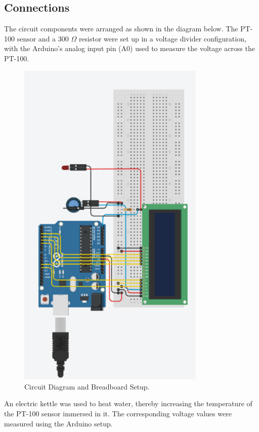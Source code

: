 \documentclass{article}
\begin{document}
	\subsection{Connections}
	The circuit components were arranged as shown in the diagram below. The PT-100 sensor and a 300 $\Omega$ resistor were set up in a voltage divider configuration, with the Arduino's analog input pin (A0) used to measure the voltage across the PT-100.
	
\begin{figure}[H]
	\centering
	\includegraphics[width=0.8\textwidth]{figs/circuit}
	\caption{Circuit Diagram and Breadboard Setup.}
	\label{fig:circuit}
\end{figure}
	
	An electric kettle was used to heat water, thereby increasing the temperature of the PT-100 sensor immersed in it. The corresponding voltage values were measured using the Arduino setup.
	
\end{document}
